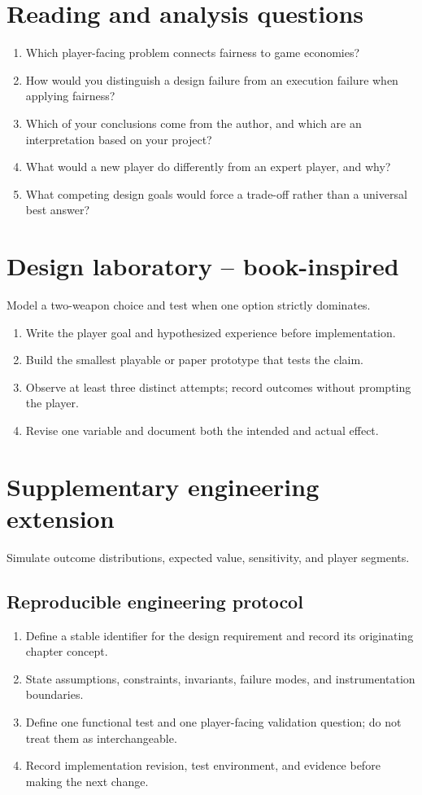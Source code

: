\documentclass[11pt]{article}
\begin{document}
\section{Reading and analysis questions}
\begin{enumerate}
\item Which player-facing problem connects fairness to game economies?
\item How would you distinguish a design failure from an execution failure when applying fairness?
\item Which of your conclusions come from the author, and which are an interpretation based on your project?
\item What would a new player do differently from an expert player, and why?
\item What competing design goals would force a trade-off rather than a universal best answer?
\end{enumerate}

\section{Design laboratory -- book-inspired}
Model a two-weapon choice and test when one option strictly dominates.

\begin{enumerate}
\item Write the player goal and hypothesized experience before implementation.
\item Build the smallest playable or paper prototype that tests the claim.
\item Observe at least three distinct attempts; record outcomes without prompting the player.
\item Revise one variable and document both the intended and actual effect.
\end{enumerate}

\section{Supplementary engineering extension}
Simulate outcome distributions, expected value, sensitivity, and player segments.


\subsection{Reproducible engineering protocol}
\begin{enumerate}
\item Define a stable identifier for the design requirement and record its originating chapter concept.
\item State assumptions, constraints, invariants, failure modes, and instrumentation boundaries.
\item Define one functional test and one player-facing validation question; do not treat them as interchangeable.
\item Record implementation revision, test environment, and evidence before making the next change.
\end{enumerate}
\end{document}
